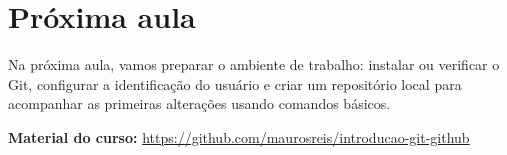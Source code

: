 \documentclass[12pt,a4paper]{article}
\begin{document}
\section{Próxima aula}
Na próxima aula, vamos preparar o ambiente de trabalho: instalar ou verificar o Git, configurar a identificação do usuário e criar um repositório local para acompanhar as primeiras alterações usando comandos básicos.

\vfill
\noindent\textbf{Material do curso:} \url{https://github.com/maurosreis/introducao-git-github}
\end{document}
